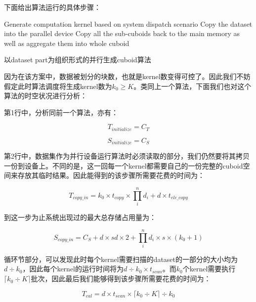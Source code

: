 下面给出算法运行的具体步骤：

\begin{algorithm}[htbp]
\SetAlgoLined
{}
Generate computation kernel based on system dispatch scenario\;
Copy the dataset into the parallel device\;
Copy all the sub-cuboids back to the main memory as well as aggregate them into whole cuboid\;
\caption{以dataset part为组织形式的并行生成cuboid算法}
\label{algo:algorithm2}
\end{algorithm}

因为在该方案中，数据被划分的块数，也就是kernel数变得可控了。因此我们不妨假定此时算法调度将生成kernel数为$k_0 \geq K$。类同上一个算法，下面我们也对这个算法的时空状况进行分析：

第1行中，分析同前一个算法，亦有：

\begin{equation}
T_{initialize} = C_T
\end{equation}

\begin{equation}
S_{initialize} = C_S
\end{equation}

第2行中，数据集作为并行设备运行算法时必须读取的部分，我们仍然要将其拷贝一份到设备上。不同的是，这一回每一个kernel都需要自己的一份完整的cuboid空间来存放其临时结果。因此能得到的该步骤所需要花费的时间为：

\begin{equation}
T_{copy\_in} = k_0 \times t_{copy} \times \prod_{i}^{n} d_i + d \times t_{ele\_copy}
\end{equation}

到这一步为止系统出现过的最大总存储占用量为：

\begin{equation}
S_{copy\_in} = C_S + d \times sd \times 2 + \prod_{i}^{n} d_i \times s \times (k_0 + 1)
\end{equation}

循环节部分，可以发现此时每个kernel需要扫描的dataset的一部分的大小均为$d \div k_0$，因此每个kernel的运行时间将为$d \div k_0 \times t_{scan}$。而$k_0$个kernel需要执行$\lceil k_0 \div K \rceil$批次，因此最后我们能够得到该步骤所需要花费的时间为：

\begin{equation}
T_{cal} = d \times t_{scan} \times \lceil k_0 \div K \rceil \div k_0
\end{equation}

